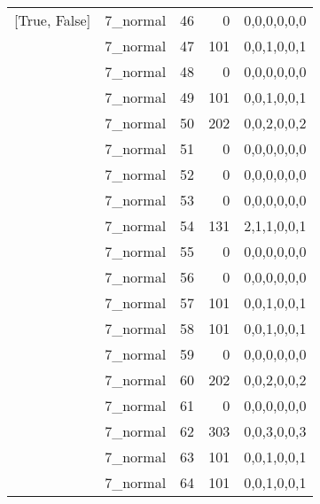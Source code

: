 \begin{tabular}{llrrl}
 [True, False]   & 7\_normal            &            46 &                     0 & 0,0,0,0,0,0   \\
 [True, False]   & 7\_normal            &            47 &                   101 & 0,0,1,0,0,1   \\
 [True, False]   & 7\_normal            &            48 &                     0 & 0,0,0,0,0,0   \\
 [True, False]   & 7\_normal            &            49 &                   101 & 0,0,1,0,0,1   \\
 [True, False]   & 7\_normal            &            50 &                   202 & 0,0,2,0,0,2   \\
 [True, False]   & 7\_normal            &            51 &                     0 & 0,0,0,0,0,0   \\
 [True, False]   & 7\_normal            &            52 &                     0 & 0,0,0,0,0,0   \\
 [True, False]   & 7\_normal            &            53 &                     0 & 0,0,0,0,0,0   \\
 [True, False]   & 7\_normal            &            54 &                   131 & 2,1,1,0,0,1   \\
 [True, False]   & 7\_normal            &            55 &                     0 & 0,0,0,0,0,0   \\
 [True, False]   & 7\_normal            &            56 &                     0 & 0,0,0,0,0,0   \\
 [True, False]   & 7\_normal            &            57 &                   101 & 0,0,1,0,0,1   \\
 [True, False]   & 7\_normal            &            58 &                   101 & 0,0,1,0,0,1   \\
 [True, False]   & 7\_normal            &            59 &                     0 & 0,0,0,0,0,0   \\
 [True, False]   & 7\_normal            &            60 &                   202 & 0,0,2,0,0,2   \\
 [True, False]   & 7\_normal            &            61 &                     0 & 0,0,0,0,0,0   \\
 [True, False]   & 7\_normal            &            62 &                   303 & 0,0,3,0,0,3   \\
 [True, False]   & 7\_normal            &            63 &                   101 & 0,0,1,0,0,1   \\
 [True, False]   & 7\_normal            &            64 &                   101 & 0,0,1,0,0,1   \\

\end{tabular}
